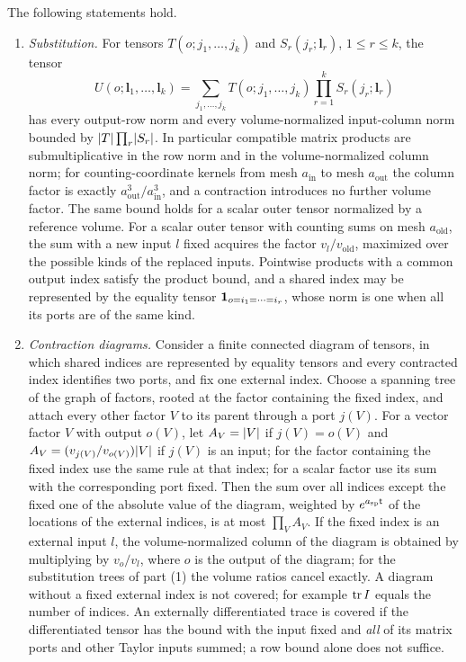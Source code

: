 \begin{lemma}\label{ch02:lem:coefficient-algebra}
The following statements hold.
\begin{enumerate}
\item \emph{Substitution.} For tensors $T(o;j_1,\dots,j_k)$ and $S_r(j_r;\mathbf l_r)$, $1\le r\le k$, the tensor
\[
 U(o;\mathbf l_1,\dots,\mathbf l_k)=\sum_{j_1,\dots,j_k}T(o;j_1,\dots,j_k)\prod_{r=1}^kS_r(j_r;\mathbf l_r)
\]
has every output-row norm and every volume-normalized input-column norm bounded by $\lvert T\rvert\prod_r\lvert S_r\rvert$. In particular compatible matrix products are submultiplicative in the row norm and in the volume-normalized column norm; for counting-coordinate kernels from mesh $a_{\mathrm{in}}$ to mesh $a_{\mathrm{out}}$ the column factor is exactly $a_{\mathrm{out}}^3/a_{\mathrm{in}}^3$, and a contraction introduces no further volume factor. The same bound holds for a scalar outer tensor normalized by a reference volume. For a scalar outer tensor with counting sums on mesh $a_{\mathrm{old}}$, the sum with a new input $l$ fixed acquires the factor $v_l/v_{\mathrm{old}}$, maximized over the possible kinds of the replaced inputs. Pointwise products with a common output index satisfy the product bound, and a shared index may be represented by the equality tensor $\mathbf 1_{o=i_1=\cdots=i_r}$, whose norm is one when all its ports are of the same kind.
\item \emph{Contraction diagrams.} Consider a finite connected diagram of tensors, in which shared indices are represented by equality tensors and every contracted index identifies two ports, and fix one external index. Choose a spanning tree of the graph of factors, rooted at the factor containing the fixed index, and attach every other factor $V$ to its parent through a port $j(V)$. For a vector factor $V$ with output $o(V)$, let $A_V=\lvert V\rvert$ if $j(V)=o(V)$ and $A_V=(v_{j(V)}/v_{o(V)})\lvert V\rvert$ if $j(V)$ is an input; for the factor containing the fixed index use the same rule at that index; for a scalar factor use its sum with the corresponding port fixed. Then the sum over all indices except the fixed one of the absolute value of the diagram, weighted by $e^{a_{\mathrm{sp}}\mathsf t}$ of the locations of the external indices, is at most $\prod_VA_V$. If the fixed index is an external input $l$, the volume-normalized column of the diagram is obtained by multiplying by $v_o/v_l$, where $o$ is the output of the diagram; for the substitution trees of part (1) the volume ratios cancel exactly. A diagram without a fixed external index is not covered; for example $\operatorname{tr} I$ equals the number of indices. An externally differentiated trace is covered if the differentiated tensor has the bound with the input fixed and \emph{all} of its matrix ports and other Taylor inputs summed; a row bound alone does not suffice.

\end{enumerate}
\end{lemma}
